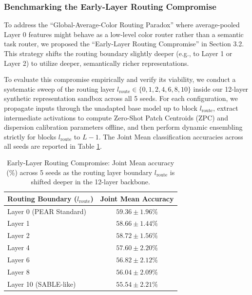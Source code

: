 \subsubsection{Benchmarking the Early-Layer Routing Compromise}
To address the ``Global-Average-Color Routing Paradox'' where average-pooled Layer 0 features might behave as a low-level color router rather than a semantic task router, we proposed the ``Early-Layer Routing Compromise'' in Section 3.2. This strategy shifts the routing boundary slightly deeper (e.g., to Layer 1 or Layer 2) to utilize deeper, semantically richer representations. 

To evaluate this compromise empirically and verify its viability, we conduct a systematic sweep of the routing layer $l_{\text{route}} \in \{0, 1, 2, 4, 6, 8, 10\}$ inside our 12-layer synthetic representation sandbox across all 5 seeds. For each configuration, we propagate inputs through the unadapted base model up to block $l_{\text{route}}$, extract intermediate activations to compute Zero-Shot Patch Centroids (ZPC) and dispersion calibration parameters offline, and then perform dynamic ensembling strictly for blocks $l_{\text{route}}$ to $L-1$. The Joint Mean classification accuracies across all seeds are reported in Table \ref{tab:early_layer_compromise}.

\begin{table}[h]
\caption{Early-Layer Routing Compromise: Joint Mean accuracy (\%) across 5 seeds as the routing layer boundary $l_{\text{route}}$ is shifted deeper in the 12-layer backbone.}
\label{tab:early_layer_compromise}
\vskip 0.15in
\begin{center}
\begin{small}
\begin{sc}
\begin{tabular}{lc}
\toprule
Routing Boundary ($l_{\text{route}}$) & Joint Mean Accuracy \\
\midrule
Layer 0 (PEAR Standard) & $59.36 \pm 1.96\%$ \\
Layer 1 & $58.66 \pm 1.44\%$ \\
Layer 2 & $58.72 \pm 1.56\%$ \\
Layer 4 & $57.60 \pm 2.20\%$ \\
Layer 6 & $56.82 \pm 2.12\%$ \\
Layer 8 & $56.04 \pm 2.09\%$ \\
Layer 10 (SABLE-like) & $55.54 \pm 2.21\%$ \\
\bottomrule
\end{tabular}
\end{sc}
\end{small}
\end{center}
\vskip -0.1in
\end{table}

